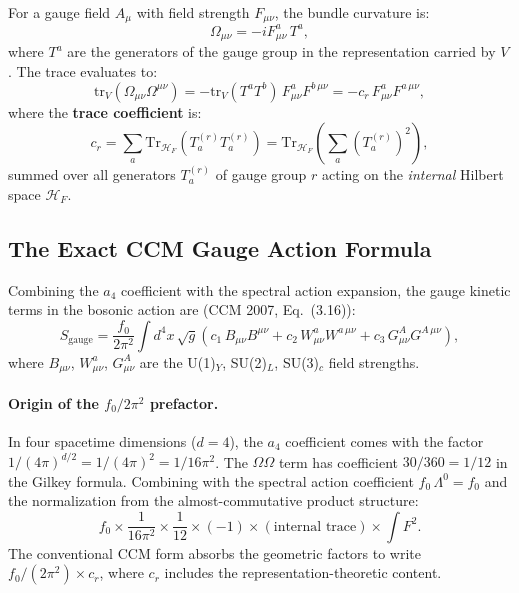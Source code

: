 \documentclass[12pt,a4paper]{article}
\begin{document}
For a gauge field $A_\mu$ with field strength $F_{\mu\nu}$, the bundle
curvature is:
\begin{equation}
\Omega_{\mu\nu} = -iF^a_{\mu\nu}\,T^a,
\end{equation}
where $T^a$ are the generators of the gauge group in the representation
carried by $V$.  The trace evaluates to:
\begin{equation}\label{eq:omega-trace}
\mathrm{tr}_V(\Omega_{\mu\nu}\Omega^{\mu\nu})
= -\mathrm{tr}_V(T^a T^b)\,F^a_{\mu\nu}F^{b\,\mu\nu}
= -c_r\,F^a_{\mu\nu}F^{a\,\mu\nu},
\end{equation}
where the \textbf{trace coefficient} is:
\begin{equation}\label{eq:trace-coefficient}
\boxed{c_r = \sum_{a} \mathrm{Tr}_{\mathcal{H}_F}(T^{(r)}_a T^{(r)}_a)
= \mathrm{Tr}_{\mathcal{H}_F}\!\left(\sum_a (T^{(r)}_a)^2\right),}
\end{equation}
summed over all generators $T^{(r)}_a$ of gauge group $r$ acting on
the \emph{internal} Hilbert space $\mathcal{H}_F$.

\subsection{The Exact CCM Gauge Action Formula}

Combining the $a_4$ coefficient with the spectral action expansion, the
gauge kinetic terms in the bosonic action are (CCM 2007, Eq.~(3.16)):
\begin{equation}\label{eq:ccm-gauge-action}
\boxed{
S_{\mathrm{gauge}} = \frac{f_0}{2\pi^2}
\int d^4x\,\sqrt{g}\left(
c_1\,B_{\mu\nu}B^{\mu\nu}
+ c_2\,W^a_{\mu\nu}W^{a\,\mu\nu}
+ c_3\,G^A_{\mu\nu}G^{A\,\mu\nu}
\right),
}
\end{equation}
where $B_{\mu\nu}$, $W^a_{\mu\nu}$, $G^A_{\mu\nu}$ are the
U(1)$_Y$, SU(2)$_L$, SU(3)$_c$ field strengths.

\paragraph{Origin of the $f_0/2\pi^2$ prefactor.}
In four spacetime dimensions ($d = 4$), the $a_4$ coefficient comes with
the factor $1/(4\pi)^{d/2} = 1/(4\pi)^2 = 1/16\pi^2$.  The
$\Omega\Omega$ term has coefficient $30/360 = 1/12$ in the Gilkey formula.
Combining with the spectral action coefficient $f_0\,\Lambda^0 = f_0$
and the normalization from the almost-commutative product structure:
\begin{equation}
f_0 \times \frac{1}{16\pi^2} \times \frac{1}{12} \times (-1)
\times (\text{internal trace}) \times \int F^2.
\end{equation}
The conventional CCM form absorbs the geometric factors to write
$f_0/(2\pi^2) \times c_r$, where $c_r$ includes the representation-theoretic
content.
\end{document}
